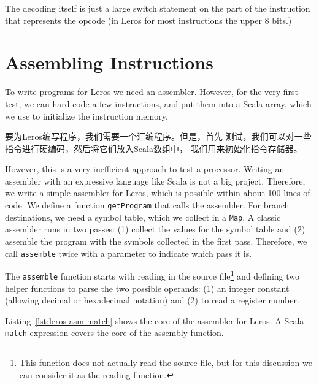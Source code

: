 \documentclass[%
    10pt,
    headinclude, footexclude,
    openright, %
    notitlepage,
    cleardoubleempty,
    headsepline,
    pointlessnumbers,
    bibtotoc, idxtotoc,
    ]{scrbook}
\newcommand{\code}[1]{{\small{\texttt{#1}}}}
\newcommand{\todo}[1]{{\emph{TODO: #1}}}
\renewcommand{\todo}[1]{}
\begin{document}

\noindent The decoding itself is just a large switch statement on the part of the
instruction that represents the opcode (in Leros for most instructions the upper
8 bits.)


\section{Assembling Instructions}

To write programs for Leros we need an assembler. However, for the very first
test, we can hard code a few instructions, and put them into a Scala array,
which we use to initialize the instruction memory.

要为Leros编写程序，我们需要一个汇编程序。但是，首先
测试，我们可以对一些指令进行硬编码，然后将它们放入Scala数组中，
我们用来初始化指令存储器。


\noindent However, this is a very inefficient approach to test a processor.
Writing an assembler with an expressive language like Scala is not a big project.
Therefore, we write a simple assembler for Leros, which is possible within about
100 lines of code. We define a function \code{getProgram} that calls the assembler.
For branch destinations, we need a symbol table, which we collect in a \code{Map}.
A classic assembler runs in two passes: (1) collect the values for the symbol table
and (2) assemble the program with the symbols collected in the first pass.
Therefore, we call \code{assemble} twice with a parameter to indicate which pass it is.


The \code{assemble} function starts with reading in the source
file\footnote{This function does not actually read the source file, but for this
discussion we can consider it as the reading function.}
and defining two helper functions to parse the two possible operands: (1) an
integer constant (allowing decimal or hexadecimal notation) and (2) to read
a register number.


Listing~\ref{lst:leros-asm-match} shows the core of the assembler for Leros.
A Scala \code{match} expression covers the core of the assembly function.
\todo{Some more words on the code.}
\end{document}
